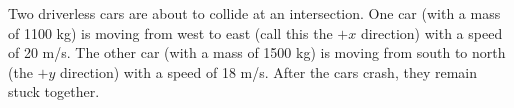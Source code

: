 \question Two driverless cars are about to collide at an intersection. One car (with a mass of 1100 kg) is moving from west to east (call this the $+x$ direction) with a speed of 20 m/s. The other car (with a mass of 1500 kg) is moving from south to north (the $+y$ direction) with a speed of 18 m/s. After the cars crash, they remain stuck together.
